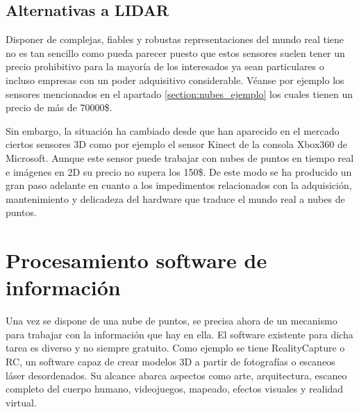 


\subsection{Alternativas a LIDAR}

Disponer de complejas, fiables y robustas representaciones del mundo real tiene no es tan sencillo como pueda parecer puesto que estos sensores suelen tener un precio prohibitivo para la mayoría de los interesados ya sean particulares o incluso empresas con un poder adquisitivo considerable. Véanse por ejemplo los sensores mencionados en el apartado \ref{section:nubes_ejemplo} los cuales tienen un precio de más de 70000\$.

Sin embargo, la situación ha cambiado desde que han aparecido en el mercado ciertos sensores 3D como por ejemplo el sensor Kinect de la consola Xbox360 de Microsoft\cite{kinect}. Aunque este sensor puede trabajar con nubes de puntos en tiempo real e imágenes en 2D su precio no supera los 150\$. De este modo se ha producido un gran paso adelante en cuanto a los impedimentos relacionados con la adquisición, mantenimiento y delicadeza del hardware que traduce el mundo real a nubes de puntos.



\fi
\section{Procesamiento software de información}\label{librerias}

Una vez se dispone de una nube de puntos, se precisa ahora de un mecanismo para trabajar con la información que hay en ella. El software existente para dicha tarea es diverso y no siempre gratuito. Como ejemplo se tiene RealityCapture\cite{realitycapture} o RC, un software capaz de crear modelos 3D a partir de fotografías o escaneos láser desordenados. Su alcance abarca aspectos como arte, arquitectura, escaneo completo del cuerpo humano, videojuegos, mapeado, efectos visuales y realidad virtual.

